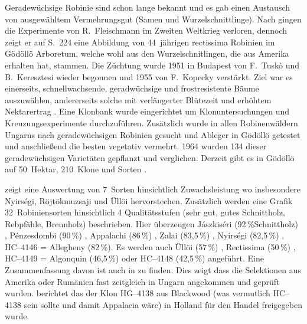 \documentclass[twocolumn]{scrartcl}
\begin{document}
Geradewüchsige Robinie sind schon lange bekannt und es gab einen
Austausch von ausgewähltem Vermehrungsgut (Samen und
Wurzelschnittlinge). Nach \citep{keresztesi1983robinie} gingen die
Experimente von R.~Fleischmann im Zweiten Weltkrieg verloren, dennoch
zeigt er auf S.~224 eine Abbildung von 44~jährigen rectissima Robinien
im Gödöllö Arboretum, welche wohl aus den Wurzelschnitlingen, die
\citet{mihalyi1937robinie} aus Amerika erhalten hat, stammen.  Die
Züchtung wurde 1951 in Budapest von F.~Tuskò und B.~Keresztesi wieder
begonnen und 1955 von F.~Kopecky verstärkt. Ziel war es einerseits,
schnellwachsende, geradwüchsige und frostresistente Bäume auszuwählen,
andererseits solche mit verlängerter Blütezeit und erhöhtem
Nektarertrag \citep{redei2007robinieSelektion,csiha2016robinie}.
Eine Klonbank wurde eingerichtet um Klonuntersuchungen
und Kreuzungsexperimente durchzuführen. Zusätzlich wurde in allen
Robinenwäldern Ungarns nach geradewüchsigen Robinien gesucht und
Ableger in Gödöllö getestet und anschließend die besten vegetativ
vermehrt. 1964 wurden 134 dieser geradewüchsigen Varietäten gepflanzt
und verglichen.  Derzeit gibt es in Gödöllö auf 50~Hektar, 210~Klone
und Sorten \citep{redei2005robinieVermehrung,csiha2016robinie}.

\citet{keresztesi1974robinie} zeigt eine Auswertung von 7~Sorten
hinsichtlich Zuwachsleistung wo insbesondere Nyirségi, Röjtökmuzsaji
und Üllöi hervorstechen. Zusätzlich werden eine Grafik 32~Robiniensorten
hinsichtlich 4 Qualitätsstufen (sehr gut, gutes Schnittholz,
Rebpfähle, Brennholz) beschrieben. Hier überzeugen
Jászkiséri (92\,\%Schnittholz)
, Pénzesdombi (90\,\%)
, Appalachi (86\,\%)
, Zalai (83,5\,\%)
, Nyirségi (82,5\,\%)
, HC--4146 = Allegheny (82\,\%). Es werden auch
Üllöi (57\,\%)
, Rectissima (50\,\%)
, HC--4149 = Algonquin (46,5\,\%)
oder HC--4148 (42,5\,\%)
angeführt.
Eine Zusammenfassung davon ist auch in \citet{keresztesi1983robinie} zu finden.
Dies zeigt dass die Selektionen aus Amerika oder Rumänien
fast zeitgleich in Ungarn angekommen und geprüft wurden.
\citet{bluemke1955robinie} berichtet das der Klon HG--4138 aus Blackwood (was
vermutlich HC--4138 sein sollte und damit Appalacia wäre) in Holland
für den Handel freigegeben wurde.
\end{document}
